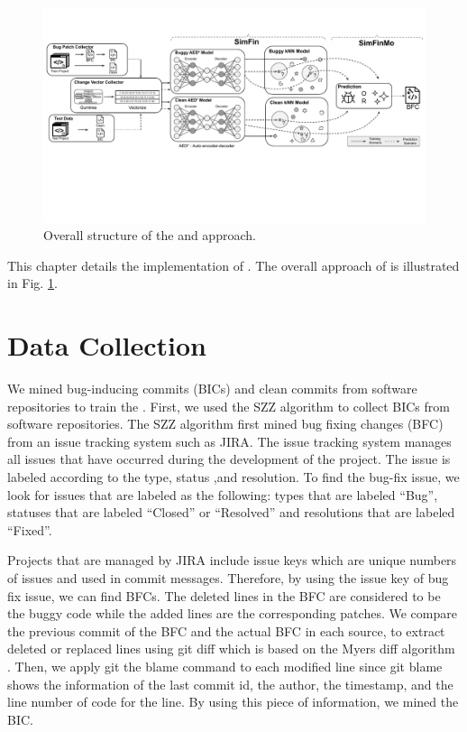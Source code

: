 \begin{figure}[!tbp]
\renewcommand{\arraystretch}{1}
    \centering
    \includegraphics[width=\textwidth]{figures/approach_fig.pdf}\hfill
    \caption{Overall structure of the {\simfin} and {\simfinmo} approach.}
    \label{fig:approach}
\end{figure}
    
     

This chapter details the implementation of {\simfinmo}.
The overall approach of {\simfinmo} is illustrated in Fig. \ref{fig:approach}.

\section{Data Collection}
We mined bug-inducing commits (BICs) and clean commits from software repositories to train the {\simfin}.
First, we used the SZZ algorithm \cite{sliwerski2005changes} to collect BICs from software repositories. 
The SZZ algorithm first mined bug fixing changes (BFC) from an issue tracking system such as JIRA.
The issue tracking system manages all issues that have occurred during the development of the project.
The issue is labeled according to the type, status ,and resolution.
To find the bug-fix issue, we look for issues that are labeled as the following: types that are labeled ``Bug'', statuses that are labeled ``Closed'' or ``Resolved'' and resolutions that are labeled ``Fixed''.

Projects that are managed by JIRA include issue keys which are unique numbers of issues and used in commit messages.
Therefore, by using the issue key of bug fix issue, we can find BFCs.
The deleted lines in the BFC are considered to be the buggy code while the added lines are the corresponding patches.
We compare the previous commit of the BFC and the actual BFC in each source, to extract deleted or replaced lines using git diff which is based on the Myers diff algorithm \cite{myers1986ano}.
Then, we apply git the blame command to each modified line since git blame shows the information of the last commit id, the author, the timestamp, and the line number of code for the line.
By using this piece of information, we mined the BIC.

